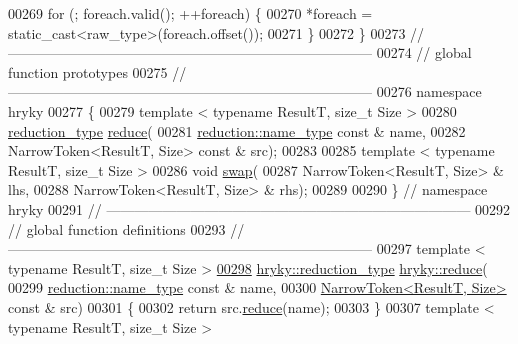 \begin{DoxyCode}
00269     \textcolor{keywordflow}{for} (; \textcolor{keywordflow}{foreach}.valid(); ++\textcolor{keywordflow}{foreach}) \{
00270         *\textcolor{keywordflow}{foreach} = \textcolor{keyword}{static\_cast<}raw\_type\textcolor{keyword}{>}(\textcolor{keywordflow}{foreach}.offset());
00271     \}
00272 \}
00273 \textcolor{comment}{//
      ------------------------------------------------------------------------------}
00274 \textcolor{comment}{// global function prototypes}
00275 \textcolor{comment}{//
      ------------------------------------------------------------------------------}
00276 \textcolor{keyword}{namespace }hryky
00277 \{
00279     \textcolor{keyword}{template} < \textcolor{keyword}{typename} ResultT, \textcolor{keywordtype}{size\_t} Size >
00280     \hyperlink{namespacehryky_a343a9a4c36a586be5c2693156200eadc}{reduction_type} \hyperlink{namespacehryky_af41cb3af6766761da0ff21b84527a52c}{reduce}(
00281         \hyperlink{namespacehryky_1_1reduction_ac686c30a4c8d196bbd0f05629a6b921f}{reduction::name_type} \textcolor{keyword}{const} & name,
00282         NarrowToken<ResultT, Size> \textcolor{keyword}{const} & src);
00283 
00285     \textcolor{keyword}{template} < \textcolor{keyword}{typename} ResultT, \textcolor{keywordtype}{size\_t} Size >
00286     \textcolor{keywordtype}{void} \hyperlink{namespacehryky_a4282146df5ea2b68cb667896a2205909}{swap}(
00287         NarrowToken<ResultT, Size> & lhs,
00288         NarrowToken<ResultT, Size> & rhs);
00289 
00290 \} \textcolor{comment}{// namespace hryky}
00291 \textcolor{comment}{//
      ------------------------------------------------------------------------------}
00292 \textcolor{comment}{// global function definitions}
00293 \textcolor{comment}{//
      ------------------------------------------------------------------------------}
00297 \textcolor{comment}{}\textcolor{keyword}{template} < \textcolor{keyword}{typename} ResultT, \textcolor{keywordtype}{size\_t} Size >
\hypertarget{narrow__token_8h_source_l00298}{}\hyperlink{namespacehryky_a5245acc3760966a01a0bf0eddbba7b11}{00298} \hyperlink{classhryky_1_1_intrusive_ptr}{hryky::reduction_type} \hyperlink{namespacehryky_af41cb3af6766761da0ff21b84527a52c}{hryky::reduce}(
00299     \hyperlink{classhryky_1_1reduction_1_1_string}{reduction::name_type} \textcolor{keyword}{const} & name,
00300     \hyperlink{classhryky_1_1_narrow_token}{NarrowToken<ResultT, Size>} \textcolor{keyword}{const} & src)
00301 \{
00302     \textcolor{keywordflow}{return} src.\hyperlink{classhryky_1_1_narrow_token_a26077cf647e46c7482990337560504fa}{reduce}(name);
00303 \}
00307 \textcolor{keyword}{template} < \textcolor{keyword}{typename} ResultT, \textcolor{keywordtype}{size\_t} Size >

\end{DoxyCode}
